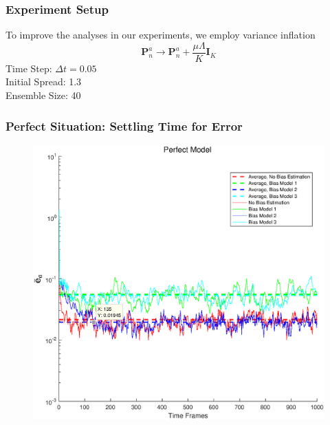 \documentclass{beamer}
\begin{document}
\begin{frame}
\frametitle{Experiment Setup}
To improve the analyses in our experiments, we employ variance inflation
\begin{equation*}
\pmb{P}_n^a\rightarrow \pmb{P}_n^a+\dfrac{\mu\Lambda}{K}\pmb{I}_K
\end{equation*}
Time Step: $\Delta t=0.05$\\
Initial Spread: 1.3\\
Ensemble Size: 40\\
\end{frame}

\begin{frame}
\frametitle{Perfect Situation: Settling Time for Error}
\begin{figure} 
\centering
\includegraphics[scale=0.4]{Figures/ErrVsTimeP1}
\end{figure}
\end{frame}
\end{document}

